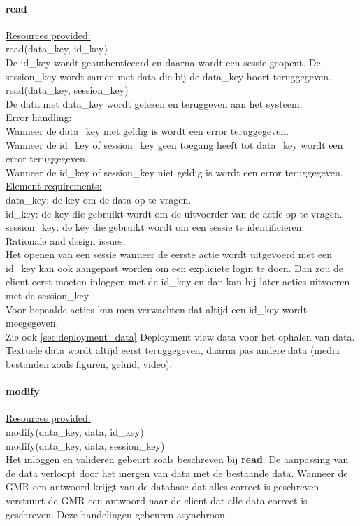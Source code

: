 \documentclass[a4paper,10pt]{article}
\begin{document}
\paragraph{read}

\underline{Resources provided:}\\
read(data\_key, id\_key)\\
\indent De id\_key wordt geauthenticeerd en daarna wordt een sessie geopent.  De session\_key wordt samen met data die bij de data\_key hoort teruggegeven.\\
read(data\_key, session\_key)\\
\indent De data met data\_key wordt gelezen en teruggeven aan het systeem.\\

\underline{Error handling:}\\
Wanneer de data\_key niet geldig is wordt een error teruggegeven.\\
Wanneer de id\_key of session\_key geen toegang heeft tot data\_key wordt een error teruggegeven.\\
Wanneer de id\_key of session\_key niet geldig is wordt een error teruggegeven.\\

\underline{Element requirements:}\\
data\_key: de key om de data op te vragen.\\
id\_key: de key die gebruikt wordt om de uitvoerder van de actie op te vragen.\\
session\_key: de key die gebruikt wordt om een sessie te identifici\"{e}ren.\\

\underline{Rationale and design issues:}\\
Het openen van een sessie wanneer de eerste actie wordt uitgevoerd met een id\_key kan ook aangepast worden om een expliciete login te doen.  Dan zou de client eerst moeten inloggen met de id\_key en dan kan hij later acties uitvoeren met de session\_key.\\
Voor bepaalde acties kan men verwachten dat altijd een id\_key wordt meegegeven.\\
Zie ook \ref{sec:deployment_data} Deployment view data voor het ophalen van data.  Textuele data wordt altijd eerst teruggegeven, daarna pas andere data (media bestanden zoals figuren, geluid, video).

\paragraph{modify}
\underline{Resources provided:}\\
modify(data\_key, data, id\_key)\\
modify(data\_key, data, session\_key)\\
Het inloggen en valideren gebeurt zoals beschreven bij \textbf{read}.
De aanpassing van de data verloopt door het mergen van data met de bestaande data.  Wanneer de GMR een antwoord krijgt van de database dat alles correct is geschreven verstuurt de GMR een antwoord naar de client dat alle data correct is geschreven.  Deze handelingen gebeuren asynchroon.
\end{document}

